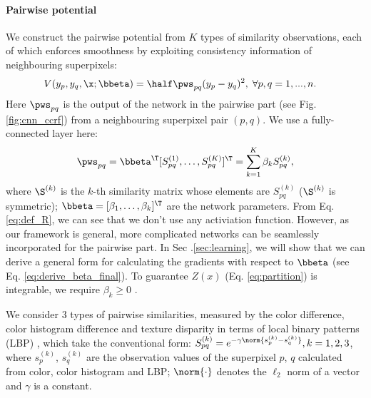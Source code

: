 \paragraph{Pairwise potential}
We construct the pairwise potential from $K$ types of similarity observations, each of which enforces smoothness by exploiting consistency information of neighbouring superpixels:
\begin{align} \label{eq:pairwise}
&V(y_{p}, y_{q}, \x; \bbeta) = \half \pws_{pq} (y_p - y_q)^2, \;\forall p,q=1,...,n.
%
\end{align}
Here $\pws_{pq}$ is the output of the network in the pairwise part (see  Fig. \ref{fig:cnn_ccrf}) from a neighbouring superpixel pair $(p,q)$. 
We use a fully-connected layer here:
\begin{align}  \label{eq:def_R}
\pws_{pq} = \bbeta^{\T} [S_{pq}^{(1)},\ldots,S_{pq}^{(K)}]^{\T} = \sum_{k=1}^K \beta_k S_{pq}^{(k)},
\end{align} 
where $\S^{(k)}$ is the $k$-th similarity matrix whose elements are $S_{pq}^{(k)}$ ($\S^{(k)}$ is symmetric);
$\bbeta=[\beta_1, \ldots, \beta_k]^{\T}$ 
are the network parameters.
From Eq. \eqref{eq:def_R}, we can see that we don't use any activiation function.
However, as our framework is general, more complicated networks can be seamlessly incorporated for the pairwise part.
In Sec .\ref{sec:learning}, we will show that we can derive a general form for calculating the gradients with respect to $\bbeta$ (see Eq. \eqref{eq:derive_beta_final}).  
%
%
%
%
To guarantee 
%
$Z(x)$ (Eq. \eqref{eq:partition}) is integrable, we require $\beta_k \geq 0$ \cite{ccrf_nips08}.
%


We consider $3$ types of pairwise similarities, measured by the color difference, color histogram difference and texture disparity in terms of local binary patterns (LBP) \cite{LBP_icpr94}, which take the conventional form: 
%
$S_{pq}^{(k)} = e^{-\gamma \norm{s_p^{(k)} - s_q^{(k)}}}, k=1,2,3$,
where $s_p^{(k)}$, $s_q^{(k)}$ are the observation values of the superpixel $p$, $q$ calculated from color, color histogram and LBP; 
$\norm{\cdot}$ denotes the $\ell_2$ norm of a vector and $\gamma$ is a constant.



%
%
%

 
%
%
%
%
%
%
%
%
%
%
%
%
%
%
%
%









